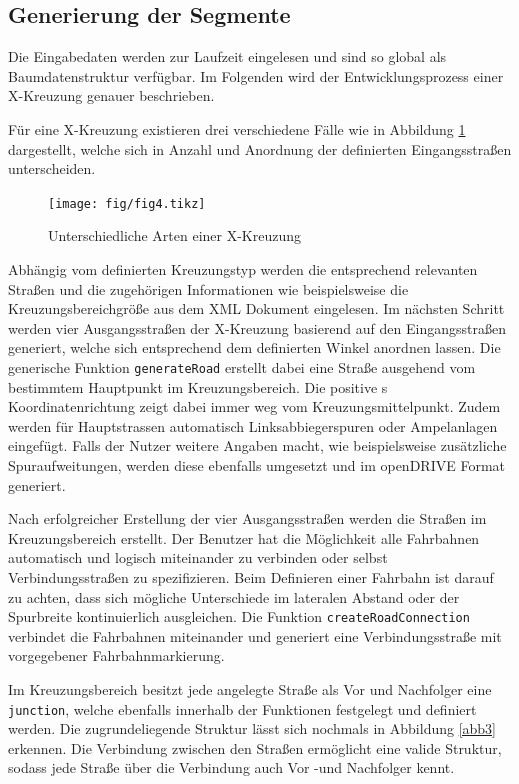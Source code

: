 \subsection{Generierung der Segmente}
Die Eingabedaten werden zur Laufzeit eingelesen und sind so global als Baumdatenstruktur verfügbar. Im Folgenden wird der Entwicklungsprozess einer X-Kreuzung genauer beschrieben.

Für eine X-Kreuzung existieren drei verschiedene Fälle wie in Abbildung \ref{abb4} dargestellt, welche sich in Anzahl und Anordnung der definierten Eingangsstraßen unterscheiden.

\begin{figure}[H]
\flushleft
\texttt{[image: fig/fig4.tikz]}
\caption{Unterschiedliche Arten einer X-Kreuzung}
\label{abb4}
\end{figure}

Abhängig vom definierten Kreuzungstyp werden die entsprechend relevanten Straßen und die zugehörigen Informationen wie beispielsweise die Kreuzungsbereichgröße aus dem XML Dokument eingelesen. Im nächsten Schritt werden vier Ausgangsstraßen der X-Kreuzung basierend auf den Eingangsstraßen generiert, welche sich entsprechend dem definierten Winkel anordnen lassen. Die generische Funktion \texttt{generateRoad} erstellt dabei eine Straße ausgehend vom bestimmtem Hauptpunkt im Kreuzungsbereich. Die positive s Koordinatenrichtung zeigt dabei immer weg vom Kreuzungsmittelpunkt. Zudem werden für Hauptstrassen automatisch Linksabbiegerspuren oder Ampelanlagen eingefügt. Falls der Nutzer weitere Angaben macht, wie beispielsweise zusätzliche Spuraufweitungen, werden diese ebenfalls umgesetzt und im openDRIVE Format generiert.

Nach erfolgreicher Erstellung der vier Ausgangsstraßen werden die Straßen im Kreuzungsbereich erstellt. Der Benutzer hat die Möglichkeit alle Fahrbahnen automatisch und logisch miteinander zu verbinden oder selbst Verbindungsstraßen zu spezifizieren. Beim Definieren einer Fahrbahn ist darauf zu achten, dass sich mögliche Unterschiede im lateralen Abstand oder der Spurbreite kontinuierlich ausgleichen. Die Funktion \texttt{createRoadConnection} verbindet die Fahrbahnen miteinander und generiert eine Verbindungsstraße mit vorgegebener Fahrbahnmarkierung.

Im Kreuzungsbereich besitzt jede angelegte Straße als Vor und Nachfolger eine \texttt{junction}, welche ebenfalls innerhalb der Funktionen festgelegt und definiert werden. Die zugrundeliegende Struktur lässt sich nochmals in Abbildung \ref{abb3} erkennen. Die Verbindung zwischen den Straßen ermöglicht eine valide Struktur, sodass jede Straße über die Verbindung auch Vor -und Nachfolger kennt.

